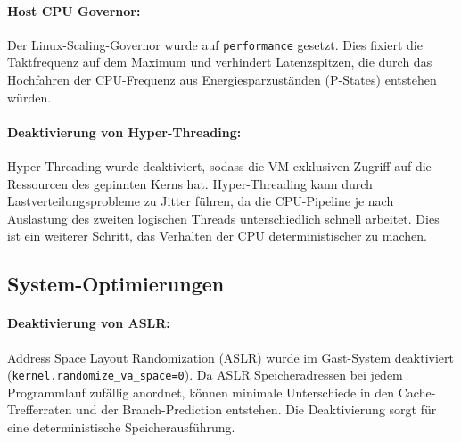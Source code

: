 \begin{sloppypar}
\paragraph{Host CPU Governor:}
Der Linux-Scaling-Governor wurde auf \texttt{performance} gesetzt.
Dies fixiert die Taktfrequenz auf dem Maximum und verhindert Latenzspitzen,
die durch das Hochfahren der \acs{CPU}-Frequenz aus Energiesparzuständen (P-States) entstehen würden. \cite{cpufreq}

\paragraph{Deaktivierung von Hyper-Threading:}
Hyper-Threading wurde deaktiviert, sodass die \acs{VM} exklusiven Zugriff auf die Ressourcen des gepinnten Kerns hat.
Hyper-Threading kann durch Lastverteilungsprobleme zu Jitter führen, da die \acs{CPU}-Pipeline je nach Auslastung des zweiten logischen Threads
unterschiedlich schnell arbeitet.
Dies ist ein weiterer Schritt, das Verhalten der \acs{CPU} deterministischer zu machen. \cite{ibm}

\subsection{System-Optimierungen}

\paragraph{Deaktivierung von ASLR:}
Address Space Layout Randomization (\acs{ASLR}) wurde im Gast-System deaktiviert (\texttt{kernel.randomize\_va\_space=0}).
Da \acs{ASLR} Speicheradressen bei jedem Programmlauf zufällig anordnet,
können minimale Unterschiede in den Cache-Trefferraten und der Branch-Prediction entstehen.
Die Deaktivierung sorgt für eine deterministische Speicherausführung. \cite{LWN.net}


\end{sloppypar}
